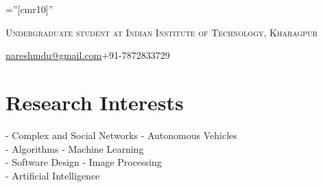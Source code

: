 \documentclass[a4paper,10pt]{article} %
\begin{document}
\pagestyle{empty} %

\font\fb=''[cmr10]'' %


\par{\bigskip\par} %
\par{\centering\large {\textsc{Undergraduate student at Indian Institute of Technology, Kharagpur}}\par}\large
\hspace{2cm}\normalsize {\href{mailto:nareshmdu@gmail.com}{nareshmdu@gmail.com}}\hfill{+91-7872833729}\hspace{2cm}

%


\section{Research Interests}

- Complex and Social Networks\hfill
- Autonomous Vehicles\hspace{3cm} \\
- Algorithms\hfill
- Machine Learning\hspace{3.6cm} \\
- Software Design\hfill
- Image Processing\hspace{3.7cm} \\
- Artificial Intelligence
\end{document}
